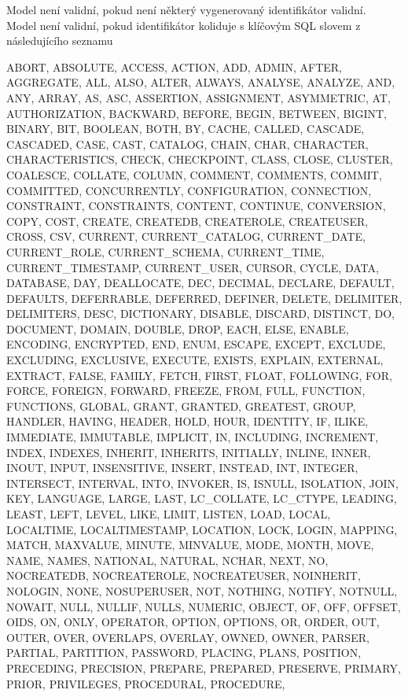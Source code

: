 \documentclass{article}
\begin{document}
Model není validní, pokud není některý vygenerovaný identifikátor validní.\\

Model není validní, pokud identifikátor koliduje s klíčovým SQL slovem z
následujícího seznamu


ABORT,
ABSOLUTE,
ACCESS,
ACTION,
ADD,
ADMIN,
AFTER,
AGGREGATE,
ALL,
ALSO,
ALTER,
ALWAYS,
ANALYSE,
ANALYZE,
AND,
ANY,
ARRAY,
AS,
ASC,
ASSERTION,
ASSIGNMENT,
ASYMMETRIC,
AT,
AUTHORIZATION,
BACKWARD,
BEFORE,
BEGIN,
BETWEEN,
BIGINT,
BINARY,
BIT,
BOOLEAN,
BOTH,
BY,
CACHE,
CALLED,
CASCADE,
CASCADED,
CASE,
CAST,
CATALOG,
CHAIN,
CHAR,
CHARACTER,
CHARACTERISTICS,
CHECK,
CHECKPOINT,
CLASS,
CLOSE,
CLUSTER,
COALESCE,
COLLATE,
COLUMN,
COMMENT,
COMMENTS,
COMMIT,
COMMITTED,
CONCURRENTLY,
CONFIGURATION,
CONNECTION,
CONSTRAINT,
CONSTRAINTS,
CONTENT,
CONTINUE,
CONVERSION,
COPY,
COST,
CREATE,
CREATEDB,
CREATEROLE,
CREATEUSER,
CROSS,
CSV,
CURRENT,
CURRENT\_CATALOG,
CURRENT\_DATE,
CURRENT\_ROLE,
CURRENT\_SCHEMA,
CURRENT\_TIME,
CURRENT\_TIMESTAMP,
CURRENT\_USER,
CURSOR,
CYCLE,
DATA,
DATABASE,
DAY,
DEALLOCATE,
DEC,
DECIMAL,
DECLARE,
DEFAULT,
DEFAULTS,
DEFERRABLE,
DEFERRED,
DEFINER,
DELETE,
DELIMITER,
DELIMITERS,
DESC,
DICTIONARY,
DISABLE,
DISCARD,
DISTINCT,
DO,
DOCUMENT,
DOMAIN,
DOUBLE,
DROP,
EACH,
ELSE,
ENABLE,
ENCODING,
ENCRYPTED,
END,
ENUM,
ESCAPE,
EXCEPT,
EXCLUDE,
EXCLUDING,
EXCLUSIVE,
EXECUTE,
EXISTS,
EXPLAIN,
EXTERNAL,
EXTRACT,
FALSE,
FAMILY,
FETCH,
FIRST,
FLOAT,
FOLLOWING,
FOR,
FORCE,
FOREIGN,
FORWARD,
FREEZE,
FROM,
FULL,
FUNCTION,
FUNCTIONS,
GLOBAL,
GRANT,
GRANTED,
GREATEST,
GROUP,
HANDLER,
HAVING,
HEADER,
HOLD,
HOUR,
IDENTITY,
IF,
ILIKE,
IMMEDIATE,
IMMUTABLE,
IMPLICIT,
IN,
INCLUDING,
INCREMENT,
INDEX,
INDEXES,
INHERIT,
INHERITS,
INITIALLY,
INLINE,
INNER,
INOUT,
INPUT,
INSENSITIVE,
INSERT,
INSTEAD,
INT,
INTEGER,
INTERSECT,
INTERVAL,
INTO,
INVOKER,
IS,
ISNULL,
ISOLATION,
JOIN,
KEY,
LANGUAGE,
LARGE,
LAST,
LC\_COLLATE,
LC\_CTYPE,
LEADING,
LEAST,
LEFT,
LEVEL,
LIKE,
LIMIT,
LISTEN,
LOAD,
LOCAL,
LOCALTIME,
LOCALTIMESTAMP,
LOCATION,
LOCK,
LOGIN,
MAPPING,
MATCH,
MAXVALUE,
MINUTE,
MINVALUE,
MODE,
MONTH,
MOVE,
NAME,
NAMES,
NATIONAL,
NATURAL,
NCHAR,
NEXT,
NO,
NOCREATEDB,
NOCREATEROLE,
NOCREATEUSER,
NOINHERIT,
NOLOGIN,
NONE,
NOSUPERUSER,
NOT,
NOTHING,
NOTIFY,
NOTNULL,
NOWAIT,
NULL,
NULLIF,
NULLS,
NUMERIC,
OBJECT,
OF,
OFF,
OFFSET,
OIDS,
ON,
ONLY,
OPERATOR,
OPTION,
OPTIONS,
OR,
ORDER,
OUT,
OUTER,
OVER,
OVERLAPS,
OVERLAY,
OWNED,
OWNER,
PARSER,
PARTIAL,
PARTITION,
PASSWORD,
PLACING,
PLANS,
POSITION,
PRECEDING,
PRECISION,
PREPARE,
PREPARED,
PRESERVE,
PRIMARY,
PRIOR,
PRIVILEGES,
PROCEDURAL,
PROCEDURE,
\end{document}
